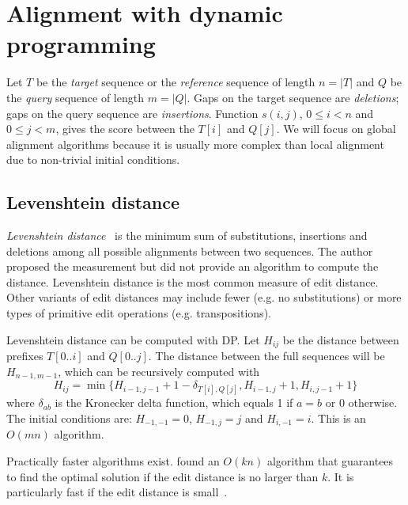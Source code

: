 \documentclass{bioinfo}
\begin{document}
\section{Alignment with dynamic programming}

Let $T$ be the \emph{target} sequence or the \emph{reference} sequence of
length $n=|T|$ and $Q$ be the \emph{query} sequence of length $m=|Q|$. Gaps on
the target sequence are \emph{deletions}; gaps on the query sequence are
\emph{insertions}. Function $s(i,j)$, $0\le i<n$ and $0\le j<m$, gives the
score between the $T[i]$ and $Q[j]$. We will focus on global alignment
algorithms because it is usually more complex than local alignment due to
non-trivial initial conditions.

\subsection{Levenshtein distance}

\emph{Levenshtein distance}~\citep{Levenshtein:1966aa} is the minimum sum of
substitutions, insertions and deletions among all possible alignments between
two sequences. The author proposed the measurement but did not provide an
algorithm to compute the distance. Levenshtein distance is the most common
measure of edit distance. Other variants of edit distances may include fewer
(e.g. no substitutions) or more types of primitive edit operations (e.g.
transpositions).

Levenshtein distance can be computed with DP. Let $H_{ij}$ be the distance
between prefixes $T[0..i]$ and $Q[0..j]$. The distance between the full
sequences will be $H_{n-1,m-1}$, which can be recursively computed with
\begin{equation}\label{eq:ed}
H_{ij}=\min\{H_{i-1,j-1}+1-\delta_{T[i],Q[j]}, H_{i-1,j}+1, H_{i,j-1}+1\}
\end{equation}
where $\delta_{ab}$ is the Kronecker delta function, which equals 1 if $a=b$ or
0 otherwise. The initial conditions are: $H_{-1,-1}=0$, $H_{-1,j}=j$ and
$H_{i,-1}=i$. This is an $O(mn)$ algorithm.

Practically faster algorithms exist. \citet{Landau:1986aa} found an $O(kn)$
algorithm that guarantees to find the optimal solution if the edit distance is
no larger than $k$. It is particularly fast if the edit distance is
small~\citep{Sosic:2015aa}.
\end{document}
